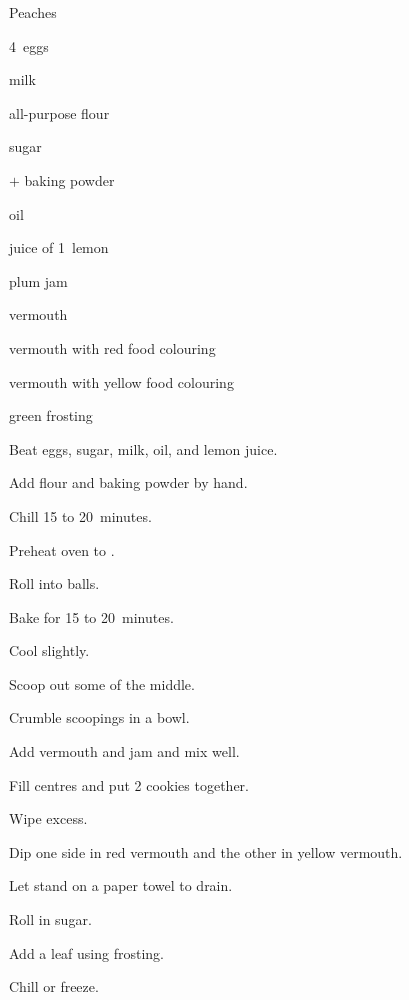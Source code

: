 \begin{recipe}{Peaches}{}{}

\begin{ingredients}
\item 4~eggs
\item {} milk
\item {} all-purpose flour
\item \C{1\half} sugar
\item {}$+$ baking powder
\item \C{1\quarter} oil
\item juice of 1~lemon
\item {} plum jam
\item \C{\threequarter} vermouth
\item vermouth with red food colouring
\item vermouth with yellow food colouring
\item green frosting
\end{ingredients}

\begin{directions}
\item Beat eggs, sugar, milk, oil, and lemon juice.
\item Add flour and baking powder by hand.
\item Chill 15 to 20~minutes.
\item Preheat oven to .
\item Roll into  balls.
\item Bake for 15 to 20~minutes.
\item Cool slightly.
\item Scoop out some of the middle.
\item Crumble scoopings in a bowl.
\item Add vermouth and jam and mix well.
\item Fill centres and put 2 cookies together.
\item Wipe excess.
\item Dip one side in red vermouth and the other in yellow vermouth.
\item Let stand on a paper towel to drain.
\item Roll in sugar.
\item Add a leaf using frosting.
\item Chill or freeze.
\end{directions}

\end{recipe}
